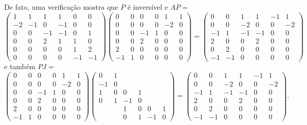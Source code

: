\documentclass[11pt,a4paper]{article}
\begin{document}
{\[\]
De fato, uma verificação mostra que $P$ é inversível e $AP=$
\[
\begin{pmatrix}
1 & 1 & 1 & 1 & 0 & 0\\
-2 & -1 & 0 & -1 & 0 & 0\\
0 & 0 & -1 & -1 & 0 & 1\\
0 & 0 &  2 & 1 & 1 & 0\\
0 &0 & 0 & 0 & 1 & 2\\
0& 0 & 0 & 0 & -1 & -1
\end{pmatrix}\begin{pmatrix}
0&0&0&0&1&1\\0&0&0&0&-2&0\\0&0&-1&1&0&0\\0&0&2&0&0&0\\2&0&0&0&0&0\\-1&1&0&0&0&0
\end{pmatrix}=\begin{pmatrix}
0&0&1&1&-1&1\\0&0&-2&0&0&-2\\-1&1&-1&-1&0&0\\2&0&0&2&0&0\\0&2&0&0&0&0\\-1&-1&0&0&0&0
\end{pmatrix}
\]
e também $PJ=$
\[
\begin{pmatrix}
0&0&0&0&1&1\\0&0&0&0&-2&0\\0&0&-1&1&0&0\\0&0&2&0&0&0\\2&0&0&0&0&0\\-1&1&0&0&0&0
\end{pmatrix}\begin{pmatrix}
0&1&&&&\\-1&0&&&&\\1&0&0&1&&\\0&1&-1&0&&\\&&1&0&0&1\\&&0&1&-1&0
\end{pmatrix}=\begin{pmatrix}
0&0&1&1&-1&1\\0&0&-2&0&0&-2\\-1&1&-1&-1&0&0\\2&0&0&2&0&0\\0&2&0&0&0&0\\-1&-1&0&0&0&0
\end{pmatrix}.
\]
}
\end{document}
